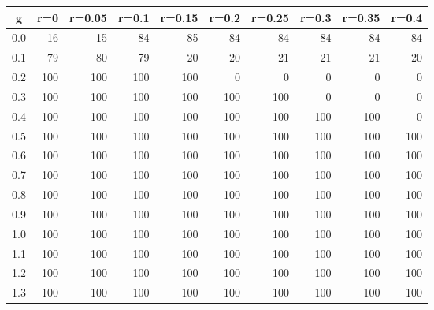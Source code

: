 %
\begin{table}[!tbp]
 \begin{center}
 \begin{tabular}{rrrrrrrrrr}\hline\hline
\multicolumn{1}{c}{g}&\multicolumn{1}{c}{r=0}&\multicolumn{1}{c}{r=0.05}&\multicolumn{1}{c}{r=0.1}&\multicolumn{1}{c}{r=0.15}&\multicolumn{1}{c}{r=0.2}&\multicolumn{1}{c}{r=0.25}&\multicolumn{1}{c}{r=0.3}&\multicolumn{1}{c}{r=0.35}&\multicolumn{1}{c}{r=0.4}\tabularnewline
\hline
0.0& 16& 15& 84& 85& 84& 84& 84& 84& 84\tabularnewline
0.1& 79& 80& 79& 20& 20& 21& 21& 21& 20\tabularnewline
0.2&100&100&100&100&  0&  0&  0&  0&  0\tabularnewline
0.3&100&100&100&100&100&100&  0&  0&  0\tabularnewline
0.4&100&100&100&100&100&100&100&100&  0\tabularnewline
0.5&100&100&100&100&100&100&100&100&100\tabularnewline
0.6&100&100&100&100&100&100&100&100&100\tabularnewline
0.7&100&100&100&100&100&100&100&100&100\tabularnewline
0.8&100&100&100&100&100&100&100&100&100\tabularnewline
0.9&100&100&100&100&100&100&100&100&100\tabularnewline
1.0&100&100&100&100&100&100&100&100&100\tabularnewline
1.1&100&100&100&100&100&100&100&100&100\tabularnewline
1.2&100&100&100&100&100&100&100&100&100\tabularnewline
1.3&100&100&100&100&100&100&100&100&100\tabularnewline
\hline
\end{tabular}

\end{center}

\end{table}

